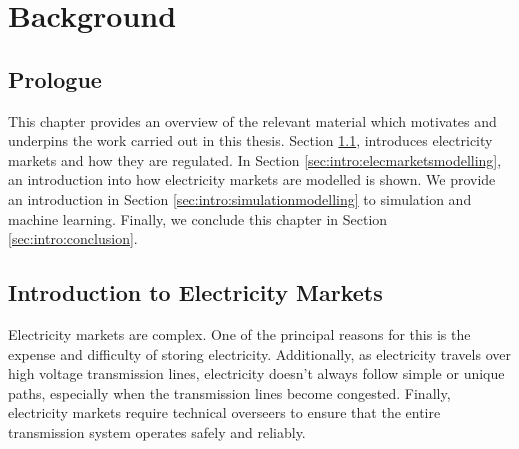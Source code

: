 
\chapter{Background}
\label{chapter:background}
\ifpdf
    \graphicspath{{Chapter2/Figs/Raster/}{Chapter2/Figs/PDF/}{Chapter2/Figs/}}
\else
    \graphicspath{{Chapter2/Figs/Vector/}{Chapter2/Figs/}}
\fi


\section*{Prologue}

This chapter provides an overview of the relevant material which motivates and underpins the work carried out in this thesis. Section \ref{sec:intro:elecmarkets}, introduces electricity markets and how they are regulated. In Section \ref{sec:intro:elecmarketsmodelling}, an introduction into how electricity markets are modelled is shown. We provide an introduction in Section \ref{sec:intro:simulationmodelling} to simulation and machine learning. Finally, we conclude this chapter in Section \ref{sec:intro:conclusion}.


%

\section{Introduction to Electricity Markets}
\label{sec:intro:elecmarkets}

Electricity markets are complex. One of the principal reasons for this is the expense and difficulty of storing electricity. Additionally, as electricity travels over high voltage transmission lines, electricity doesn't always follow simple or unique paths, especially when the transmission lines become congested. Finally, electricity markets require technical overseers to ensure that the entire transmission system operates safely and reliably. 

